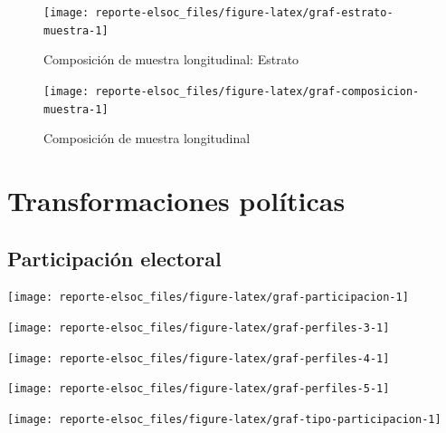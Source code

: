 \documentclass[
  12pt,
]{book}
\begin{document}
\begin{figure}

{\centering \texttt{[image: reporte-elsoc\_files/figure-latex/graf-estrato-muestra-1]} 

}

\caption{Composición de muestra longitudinal: Estrato}\label{fig:graf-estrato-muestra}
\end{figure}

\begin{figure}

{\centering \texttt{[image: reporte-elsoc\_files/figure-latex/graf-composicion-muestra-1]} 

}

\caption{Composición de muestra longitudinal}\label{fig:graf-composicion-muestra}
\end{figure}

\hypertarget{transformaciones-poluxedticas}{%
\chapter{Transformaciones políticas}\label{transformaciones-poluxedticas}}

\hypertarget{participaciuxf3n-electoral}{%
\section{Participación electoral}\label{participaciuxf3n-electoral}}

\begin{center}\texttt{[image: reporte-elsoc\_files/figure-latex/graf-participacion-1]} \end{center}

\begin{center}\texttt{[image: reporte-elsoc\_files/figure-latex/graf-perfiles-3-1]} \end{center}

\begin{center}\texttt{[image: reporte-elsoc\_files/figure-latex/graf-perfiles-4-1]} \end{center}

\begin{center}\texttt{[image: reporte-elsoc\_files/figure-latex/graf-perfiles-5-1]} \end{center}

\begin{center}\texttt{[image: reporte-elsoc\_files/figure-latex/graf-tipo-participacion-1]} \end{center}
\end{document}
